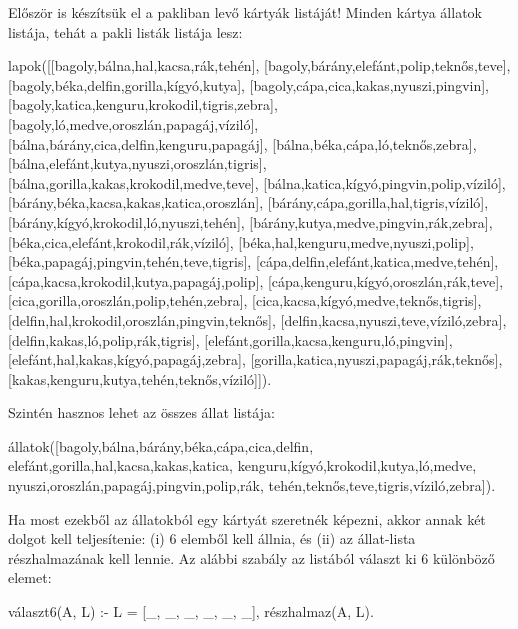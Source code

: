 Először is készítsük el a pakliban levő kártyák
listáját! Minden kártya állatok listája, tehát a
pakli listák listája lesz:
\begin{program}
lapok([[bagoly,bálna,hal,kacsa,rák,tehén],
       [bagoly,bárány,elefánt,polip,teknős,teve],
       [bagoly,béka,delfin,gorilla,kígyó,kutya],
       [bagoly,cápa,cica,kakas,nyuszi,pingvin],
       [bagoly,katica,kenguru,krokodil,tigris,zebra],
       [bagoly,ló,medve,oroszlán,papagáj,víziló],
       [bálna,bárány,cica,delfin,kenguru,papagáj],
       [bálna,béka,cápa,ló,teknős,zebra],
       [bálna,elefánt,kutya,nyuszi,oroszlán,tigris],
       [bálna,gorilla,kakas,krokodil,medve,teve],
       [bálna,katica,kígyó,pingvin,polip,víziló],
       [bárány,béka,kacsa,kakas,katica,oroszlán],
       [bárány,cápa,gorilla,hal,tigris,víziló],
       [bárány,kígyó,krokodil,ló,nyuszi,tehén],
       [bárány,kutya,medve,pingvin,rák,zebra],
       [béka,cica,elefánt,krokodil,rák,víziló],
       [béka,hal,kenguru,medve,nyuszi,polip],
       [béka,papagáj,pingvin,tehén,teve,tigris],
       [cápa,delfin,elefánt,katica,medve,tehén],
       [cápa,kacsa,krokodil,kutya,papagáj,polip],
       [cápa,kenguru,kígyó,oroszlán,rák,teve],
       [cica,gorilla,oroszlán,polip,tehén,zebra],
       [cica,kacsa,kígyó,medve,teknős,tigris],
       [delfin,hal,krokodil,oroszlán,pingvin,teknős],
       [delfin,kacsa,nyuszi,teve,víziló,zebra],
       [delfin,kakas,ló,polip,rák,tigris],
       [elefánt,gorilla,kacsa,kenguru,ló,pingvin],
       [elefánt,hal,kakas,kígyó,papagáj,zebra],
       [gorilla,katica,nyuszi,papagáj,rák,teknős],
       [kakas,kenguru,kutya,tehén,teknős,víziló]]).
\end{program}

Szintén hasznos lehet az összes állat listája:
\begin{program}
állatok([bagoly,bálna,bárány,béka,cápa,cica,delfin,
         elefánt,gorilla,hal,kacsa,kakas,katica,
         kenguru,kígyó,krokodil,kutya,ló,medve,
         nyuszi,oroszlán,papagáj,pingvin,polip,rák,
         tehén,teknős,teve,tigris,víziló,zebra]).
\end{program}

Ha most ezekből az állatokból egy kártyát szeretnék
képezni, akkor annak két dolgot kell teljesítenie:
(i) 6 elemből kell állnia, és (ii) az állat-lista
részhalmazának kell lennie. Az alábbi szabály az
 listából választ ki 6 különböző elemet:
\begin{program}
választ6(A, L) :-
    L = [_, _, _, _, _, _],
    részhalmaz(A, L).
\end{program}

